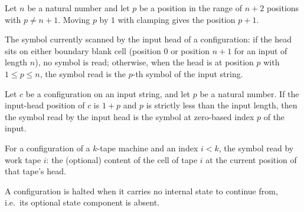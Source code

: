 \begin{lemma}
\label{Turing.moveInputPos_pos_of_ne_right}
\leanok
{}
Let $n$ be a natural number and let $p$ be a position in the range of $n+2$ positions
with $p\ne n+1$. Moving $p$ by $1$ with clamping gives the position $p+1$.
\end{lemma}

\begin{definition}
\label{Turing.Cfg.inputSymbol}
\leanok
{}
The symbol currently scanned by the input head of a configuration: if the head sits on
either boundary blank cell (position $0$ or position $n + 1$ for an input of length $n$),
no symbol is read; otherwise, when the head is at position $p$ with $1 \le p \le n$, the
symbol read is the $p$-th symbol of the input string.
\end{definition}

\begin{lemma}
\label{Turing.inputSymbolInner}
\leanok
{}
Let $c$ be a configuration on an input string, and let $p$ be a natural number. If the
input-head position of $c$ is $1+p$ and $p$ is strictly less than the input length, then
the symbol read by the input head is the symbol at zero-based index $p$ of the input.
\end{lemma}

\begin{definition}
\label{Turing.Cfg.workTapeSymbols}
\leanok
{}
For a configuration of a $k$-tape machine and an index $i < k$, the symbol read by work
tape $i$: the (optional) content of the cell of tape $i$ at the current position of that
tape's head.
\end{definition}

\begin{definition}
\label{Turing.Cfg.Halted}
\leanok
{}
A configuration is halted when it carries no internal state to continue from, i.e.\ its
optional state component is absent.
\end{definition}

